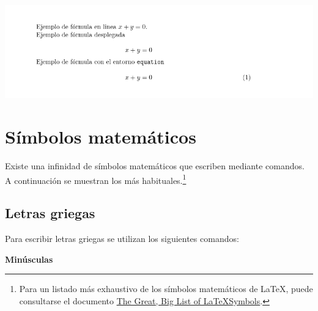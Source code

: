 \documentclass[
  letterpaper,
  DIV=11,
  numbers=noendperiod]{scrreport}
\begin{document}
\begin{tcolorbox}[enhanced jigsaw, arc=.35mm, toprule=.15mm, opacitybacktitle=0.6, colback=white, coltitle=black, colbacktitle=quarto-callout-note-color!10!white, breakable, colframe=quarto-callout-note-color-frame, left=2mm, opacityback=0, bottomtitle=1mm, toptitle=1mm, titlerule=0mm, title={Salida}, bottomrule=.15mm, leftrule=.75mm, rightrule=.15mm]
\includegraphics{./img/formulas/entornos-matematicos.png}
\end{tcolorbox}

\hypertarget{suxedmbolos-matemuxe1ticos}{%
\section{Símbolos matemáticos}\label{suxedmbolos-matemuxe1ticos}}

Existe una infinidad de símbolos matemáticos que escriben mediante
comandos. A continuación se muestran los más habituales.\footnote{Para
  un listado más exhaustivo de los símbolos matemáticos de \LaTeX,
  puede consultarse el documento
  \href{https://www3.nd.edu/~nmark/UsefulFacts/LaTeX_symbols.pdf}{The
  Great, Big List of \LaTeX Symbols}.}

\hypertarget{letras-griegas}{%
\subsection{Letras griegas}\label{letras-griegas}}

Para escribir letras griegas se utilizan los siguientes comandos:

\textbf{Minúsculas}
\end{document}
